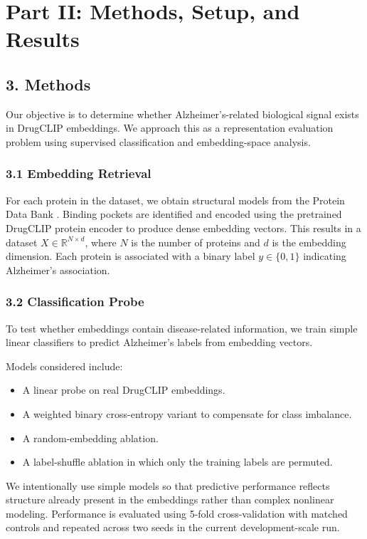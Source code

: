 \documentclass{article}
\begin{document}
\section*{Part II: Methods, Setup, and Results}

\subsection*{3. Methods}
Our objective is to determine whether Alzheimer's-related biological signal exists in DrugCLIP embeddings. We approach this as a representation evaluation problem using supervised classification and embedding-space analysis.

\subsubsection*{3.1 Embedding Retrieval}
For each protein in the dataset, we obtain structural models from the Protein Data Bank \cite{pdb2000}. Binding pockets are identified \cite{method2018} and encoded using the pretrained DrugCLIP protein encoder to produce dense embedding vectors. This results in a dataset $X \in \mathbb{R}^{N \times d}$, where $N$ is the number of proteins and $d$ is the embedding dimension. Each protein is associated with a binary label $y \in \{0,1\}$ indicating Alzheimer's association.

\subsubsection*{3.2 Classification Probe}
To test whether embeddings contain disease-related information, we train simple linear classifiers to predict Alzheimer's labels from embedding vectors.

Models considered include:
\begin{itemize}
    \item A linear probe on real DrugCLIP embeddings.
    \item A weighted binary cross-entropy variant to compensate for class imbalance.
    \item A random-embedding ablation.
    \item A label-shuffle ablation in which only the training labels are permuted.
\end{itemize}

We intentionally use simple models so that predictive performance reflects structure already present in the embeddings rather than complex nonlinear modeling. Performance is evaluated using 5-fold cross-validation with matched controls and repeated across two seeds in the current development-scale run.
\end{document}
